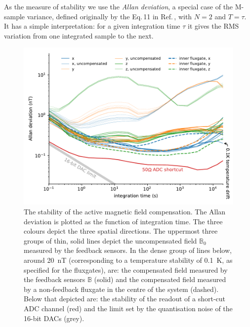 As the measure of stability we use the \emph{Allan deviation}, a special case of the M-sample variance, defined originally by the Eq.\,11 in Ref.\,\cite{Allan1966}, with $N=2$ and $T = \tau$.
It has a simple interpretation: for a given integration time $\tau$ it gives the RMS variation from one integrated sample to the next.

\begin{figure}
  \centering
  \includegraphics[width=\linewidth]{gfx/prototype/run8_field_stability.pdf}
  \caption{The stability of the active magnetic field compensation. The Allan deviation is plotted as the function of integration time. The three colours depict the three spatial directions. The uppermost three groups of thin, solid lines depict the uncompensated field $\mathbb{B}_0$ measured by the feedback sensors. In the dense group of lines below, around \SI{20}{\nano\tesla} (corresponding to a temperature stability of \SI{0.1}{\kelvin}, as specified for the fluxgates), are: the compensated field measured by the feedback sensors $\mathbb{B}$ (solid) and the compensated field measured by a non-feedback fluxgate in the centre of the system (dashed).
  Below that depicted are: the stability of the readout of a short-cut ADC channel (red) and the limit set by the quantisation noise of the 16-bit DACs (grey).}\label{fig:prototype_stability}
\end{figure}

